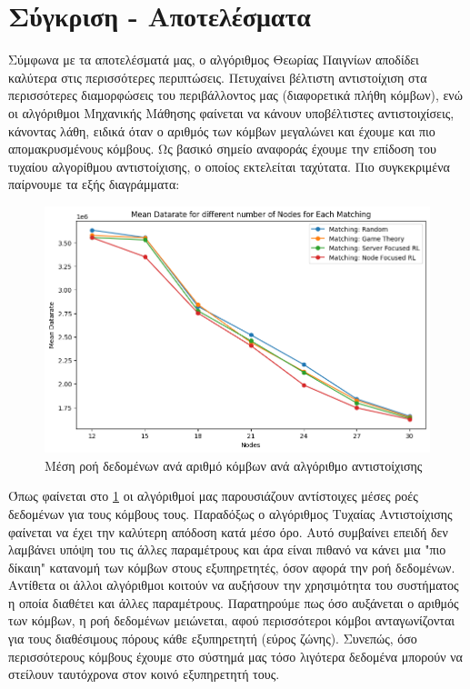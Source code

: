 \section{Σύγκριση - Αποτελέσματα}

Σύμφωνα με τα αποτελέσματά μας, ο αλγόριθμος Θεωρίας Παιγνίων αποδίδει καλύτερα στις περισσότερες περιπτώσεις. Πετυχαίνει βέλτιστη αντιστοίχιση στα περισσότερες διαμορφώσεις του περιβάλλοντος μας (διαφορετικά πλήθη κόμβων), ενώ οι αλγόριθμοι Μηχανικής Μάθησης φαίνεται να κάνουν υποβέλτιστες αντιστοιχίσεις, κάνοντας λάθη, ειδικά όταν ο αριθμός των κόμβων μεγαλώνει και έχουμε και πιο απομακρυσμένους κόμβους. Ως βασικό σημείο αναφοράς έχουμε την επίδοση του τυχαίου αλγορίθμου αντιστοίχισης, ο οποίος εκτελείται ταχύτατα.  Πιο συγκεκριμένα παίρνουμε τα εξής διαγράμματα:

\begin{figure}[H]
    \centering
    \includegraphics[width=\textwidth]{figures/chapter3/Mean_Datarate_vs_Nodes.png}
    \caption{Μέση ροή δεδομένων ανά αριθμό κόμβων ανά αλγόριθμο αντιστοίχισης}
    \label{fig7}
\end{figure}

Όπως φαίνεται στο \ref{fig7} οι αλγόριθμοί μας παρουσιάζουν αντίστοιχες μέσες ροές δεδομένων για τους κόμβους τους. Παραδόξως ο αλγόριθμος Τυχαίας Αντιστοίχισης φαίνεται να έχει την καλύτερη απόδοση κατά μέσο όρο. Αυτό συμβαίνει επειδή δεν λαμβάνει υπόψη του τις άλλες παραμέτρους και άρα είναι πιθανό να κάνει μια "πιο δίκαιη" κατανομή των κόμβων στους εξυπηρετητές, όσον αφορά την ροή δεδομένων. Αντίθετα οι άλλοι αλγόριθμοι κοιτούν να αυξήσουν την χρησιμότητα του συστήματος η οποία διαθέτει και άλλες παραμέτρους. Παρατηρούμε πως όσο αυξάνεται ο αριθμός των κόμβων, η ροή δεδομένων μειώνεται, αφού περισσότεροι κόμβοι ανταγωνίζονται για τους διαθέσιμους πόρους κάθε εξυπηρετητή (εύρος ζώνης). Συνεπώς, όσο περισσότερους κόμβους έχουμε στο σύστημά μας τόσο λιγότερα δεδομένα μπορούν να στείλουν ταυτόχρονα στον κοινό εξυπηρετητή τους.

